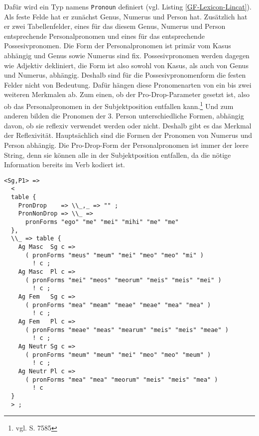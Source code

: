 Dafür wird ein Typ namens \texttt{Pronoun} definiert (vgl. Listing \ref{GF-Lexicon-Lincat}). Als feste Felde hat er zunächst Genus, Numerus und Person hat. Zusätzlich hat er zwei Tabellenfelder, eines für das diesem Genus, Numerus und Person entsprechende Personalpronomen und eines für das entsprechende Possesivpronomen. Die Form der Personalpronomen ist primär vom Kasus abhängig und Genus sowie Numerus sind fix. Possesivpronomen werden dagegen wie Adjektiv dekliniert, die Form ist also sowohl von Kasus, als auch von Genus und Numerus, abhängig. Deshalb sind für die Possesivpronomenform die festen Felder nicht von Bedeutung. Dafür hängen diese Pronomenarten von ein bis zwei weiteren Merkmalen ab. Zum einen, ob der Pro-Drop-Parameter gesetzt ist, also ob das Personalpronomen in der Subjektposition entfallen kann.\footnote{vgl. \cite{METZLER2004} S. 7585} Und zum anderen bilden die Pronomen der 3. Person unterschiedliche Formen, abhängig davon, ob sie reflexiv verwendet werden oder nicht. Deshalb gibt es das Merkmal der Reflexivität. Hauptsächlich sind die Formen der Pronomen von Numerus und Person abhängig. Die Pro-Drop-Form der Personalpronomen ist immer der leere String, denn sie können alle in der Subjektposition entfallen, da die nötige Information bereits im Verb kodiert ist. \par
\begin{lstlisting}[float=h!tp,caption={Ausschnitt aus der Funktion \texttt{mkPronoun} für 1. und 2. Person Singular (vgl. \textbf{ResLat.gf})},label={GF-Res-MkPronoun-1u2Sg},basicstyle=\small]
<Sg,P1> =>
  < 
  table { 
    PronDrop    => \\_,_ => "" ;  
    PronNonDrop => \\_ => 
      pronForms "ego" "me" "mei" "mihi" "me" "me"
  },
  \\_ => table {
    Ag Masc  Sg c => 
      ( pronForms "meus" "meum" "mei" "meo" "meo" "mi" ) 
        ! c ;
    Ag Masc  Pl c => 
      ( pronForms "mei" "meos" "meorum" "meis" "meis" "mei" ) 
        ! c ;
    Ag Fem   Sg c => 
      ( pronForms "mea" "meam" "meae" "meae" "mea" "mea" ) 
        ! c ;
    Ag Fem   Pl c => 
      ( pronForms "meae" "meas" "mearum" "meis" "meis" "meae" )
        ! c ;
    Ag Neutr Sg c => 
      ( pronForms "meum" "meum" "mei" "meo" "meo" "meum" ) 
        ! c ;
    Ag Neutr Pl c => 
      ( pronForms "mea" "mea" "meorum" "meis" "meis" "mea" ) 
        ! c
  }
  > ;
\end{lstlisting}
